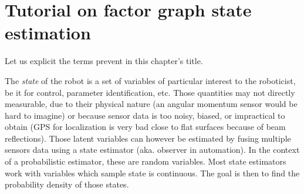 \chapter{Tutorial on factor graph state estimation}
\minitoc

Let us explicit the terms prevent in this chapter's title. 

The \textit{state} of the robot is a set of variables of particular interest to the roboticist, be it for control, parameter identification, etc.
Those quantities may not directly measurable, due to their physical nature (an angular momentum sensor would be hard to imagine) or because sensor data
is too noisy, biased, or impractical to obtain (\eg GPS for localization is very bad close to flat surfaces because of beam reflections). 
Those latent variables can however be estimated by fusing multiple sensors data using a state estimator (aka. observer in automation). In the context of 
a probabilistic estimator, these are random variables. Most state estimators work with variables which sample state is continuous. The goal is then 
to find the probability density of those states.

